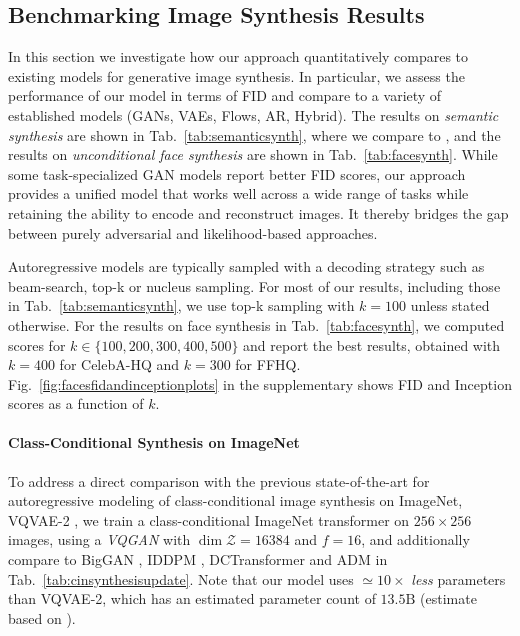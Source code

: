 \documentclass[final]{cvpr}
\begin{document}
%
\subsection{Benchmarking Image Synthesis Results}
\label{subsec:quantitative}
\semanticsynthesis
%
%
\noindent In this section we investigate how our approach quantitatively compares to existing models for generative image synthesis. 
In particular, we assess the performance of our model in terms of FID and compare to a variety of established
models (GANs, VAEs, Flows, AR, Hybrid). The results on \emph{semantic synthesis}
are shown in Tab.~\ref{tab:semanticsynth}, where we compare to
\cite{park2019semantic, wang2018pix2pixHD, katiyar2021improving, ChenK17}, and
the results on \emph{unconditional face synthesis} are shown in
Tab.~\ref{tab:facesynth}.
While some task-specialized GAN models report better FID scores, our approach
provides a unified model that works well across a wide range of tasks while
retaining the ability to encode and reconstruct images. It thereby bridges the
gap between purely adversarial and likelihood-based approaches.

\noindent Autoregressive models are typically sampled with
a decoding strategy \cite{DBLP:conf/iclr/HoltzmanBDFC20} such as beam-search, top-k or nucleus sampling.
For most of our results, including those in Tab.~\ref{tab:semanticsynth}, we use
top-k sampling with $k=100$ unless stated otherwise. For the results on face
synthesis in Tab.~\ref{tab:facesynth}, we computed scores for
$k\in\{100,200,300,400,500\}$ and report the best results, obtained with
$k=400$ for CelebA-HQ and $k=300$ for FFHQ. Fig.~\ref{fig:facesfidandinceptionplots} in the
supplementary shows FID and Inception scores as a function of $k$.

%
%
%
\celebahq
\vspace{-1em}
\paragraph{Class-Conditional Synthesis on ImageNet}
%
\cinsynthesisupdate
\morecinsamples
\fidandinceptionplots
%
\noindent To address a direct comparison with the previous state-of-the-art
for autoregressive modeling of
class-conditional image synthesis on ImageNet, VQVAE-2 \cite{razavi2019generating}, 
we train a class-conditional ImageNet transformer
on $256 \times 256$ images, using a \emph{VQGAN} with $\dim \mathcal{Z}=16384$
and $f=16$, and additionally compare to BigGAN \cite{brock2018large}, IDDPM
\cite{nichol2021improved}, DCTransformer \cite{nash2021generating} and 
ADM \cite{dhariwal2021diffusion} in Tab.~\ref{tab:cinsynthesisupdate}. Note that
%
our model uses $\simeq 10 \times$ \emph{less} parameters than
VQVAE-2, which has an estimated parameter count of $13.5 \text{B}$ (estimate
based on \cite{seonghyeon2020}).
\end{document}
